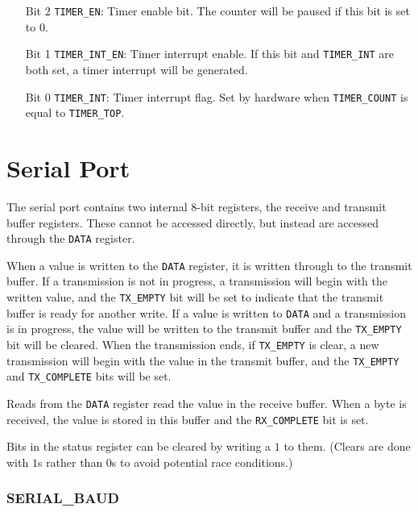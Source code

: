 \documentclass[11pt,openany]{report}
\begin{document}
\begin{enumerate}
  \item[Bit 2] \verb|TIMER_EN|: Timer enable bit. The counter will be paused if
    this bit is set to 0.
  \item[Bit 1] \verb|TIMER_INT_EN|: Timer interrupt enable. If this bit and
    \verb|TIMER_INT| are both set, a timer interrupt will be generated.
  \item[Bit 0] \verb|TIMER_INT|: Timer interrupt flag. Set by hardware
    when \verb|TIMER_COUNT| is equal to \verb|TIMER_TOP|.
\end{enumerate}

\section{Serial Port}

The serial port contains two internal 8-bit registers, the receive and
transmit buffer registers. These cannot be accessed directly, but instead
are accessed through the \verb|DATA| register.

When a value is written to the \verb|DATA| register, it is written
through to the transmit buffer. If a transmission is not in progress,
a transmission will begin with the written value, and the \verb|TX_EMPTY|
bit will be set to indicate that the transmit buffer is ready for
another write. If a value is written to \verb|DATA| and a transmission
is in progress, the value will be written to the transmit buffer and
the \verb|TX_EMPTY| bit will be cleared. When the transmission
ends, if \verb|TX_EMPTY| is clear, a new transmission will begin
with the value in the transmit buffer, and the \verb|TX_EMPTY|
and \verb|TX_COMPLETE| bits will be set.

Reads from the \verb|DATA| register read the value in the receive buffer.
When a byte is received, the value is stored in this buffer and the
\verb|RX_COMPLETE| bit is set.

Bits in the status register can be cleared by writing a $1$ to
them. (Clears are done with $1$s rather than $0$s to avoid potential
race conditions.)

\subsubsection{SERIAL\_BAUD}
\end{document}
